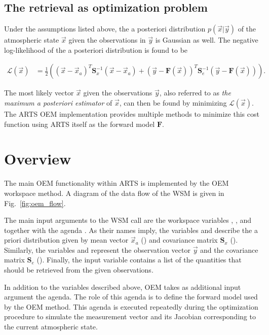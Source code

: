 \subsection{The retrieval as optimization problem}

Under the assumptions listed above, the a posteriori distribution $p(\vec{x} | \vec{y})$
of the atmospheric state $\vec{x}$ given the observations in $\vec{y}$
is Gaussian as well. The negative log-likelihood of the a posteriori distribution
is found to be

\begin{eqnarray}\label{eq:oem_cost}
 \mathcal{L}(\vec{x}) &= \frac{1}{2} \left (
	(\vec{x} - \vec{x}_a)^T \mathbf{S}^{-1}_x (\vec{x} - \vec{x}_a) +
        (\vec{y} - \mathbf{F}(\vec{x}))^T \mathbf{S}^{-1}_e (\vec{y} - \mathbf{F}(\vec{x}))
       	\right ).
\end{eqnarray}

The most likely vector $\vec{x}$ given the observations $\vec{y}$, also referred to
as \textit{the maximum a posteriori estimator} of $\vec{x}$, can then be
 found by minimizing $\mathcal{L}(\vec{x})$. The ARTS OEM implementation provides
multiple methods to minimize this cost function using ARTS itself as the forward model
$\mathbf{F}$.

\section{Overview}

The main OEM functionality within ARTS is implemented by the OEM workspace method.
A diagram of the data flow of the  WSM is given in Fig.~\ref{fig:oem_flow}.

The main input arguments to the WSM call are the workspace variables 
, ,  and
 together with the agenda .
 As their names imply, the variables
  and  describe the a priori distribution given
by mean vector $\vec{x}_a$ () and covariance matrix $\mathbf{S}_x$
(). Similarly, the variables  and
 represent the observation vector $\vec{y}$ and the
 covariance matrix $\mathbf{S}_e$
(). Finally, the  input
 variable contains a list of the quantities that should be retrieved from the
given observations.

In addition to the variables described above, OEM takes as additional input argument
the  agenda. The role of this agenda is to define
the forward model used by the OEM method. This agenda is executed repeatedly during the
optimization procedure to simulate the measurement vector and its Jacobian corresponding to
the current atmospheric state.

